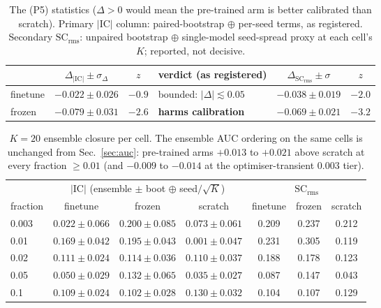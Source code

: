 \documentclass[11pt]{article}
\newcommand{\IC}{\ensuremath{\mathrm{IC}}}
\newcommand{\SCr}{\ensuremath{\mathrm{SC_{rms}}}}
\begin{document}
\begin{table}[h]\centering\small
\begin{tabular}{@{}lccl|cc@{}}
\toprule
 & $\Delta_{|\IC|} \pm \sigma_\Delta$ & $z$ & verdict (as registered)
 & $\Delta_{\SCr} \pm \sigma$ & $z$ \\
\midrule
finetune & $-0.022 \pm 0.026$ & $-0.9$ & bounded: $|\Delta| \lesssim 0.05$
         & $-0.038 \pm 0.019$ & $-2.0$ \\
frozen   & $-0.079 \pm 0.031$ & $-2.6$ & \textbf{harms calibration}
         & $-0.069 \pm 0.021$ & $-3.2$ \\
\bottomrule
\end{tabular}
\caption{The (P5) statistics ($\Delta > 0$ would mean the pre-trained arm is better
calibrated than scratch). Primary $|\IC|$ column: paired-bootstrap $\oplus$ per-seed
terms, as registered. Secondary \SCr: unpaired bootstrap $\oplus$ single-model seed-spread
proxy at each cell's $K$; reported, not decisive.}
\label{tab:p5verdict}
\end{table}

\begin{table}[h]\centering\small
\begin{tabular}{@{}lccc|ccc@{}}
\toprule
 & \multicolumn{3}{c|}{$|\IC|$ (ensemble $\pm$ boot $\oplus$ seed$/\sqrt{K}$)}
 & \multicolumn{3}{c}{\SCr} \\
fraction & finetune & frozen & scratch & finetune & frozen & scratch \\
\midrule
0.003 & $0.022 \pm 0.066$ & $0.200 \pm 0.085$ & $0.073 \pm 0.061$ & 0.209 & 0.237 & 0.212 \\
0.01  & $0.169 \pm 0.042$ & $0.195 \pm 0.043$ & $0.001 \pm 0.047$ & 0.231 & 0.305 & 0.119 \\
0.02  & $0.111 \pm 0.024$ & $0.114 \pm 0.036$ & $0.110 \pm 0.037$ & 0.188 & 0.178 & 0.123 \\
0.05  & $0.050 \pm 0.029$ & $0.132 \pm 0.065$ & $0.035 \pm 0.027$ & 0.087 & 0.147 & 0.043 \\
0.1   & $0.109 \pm 0.024$ & $0.102 \pm 0.028$ & $0.130 \pm 0.032$ & 0.104 & 0.107 & 0.129 \\
\bottomrule
\end{tabular}
\caption{$K{=}20$ ensemble closure per cell. The ensemble AUC ordering on the same cells
is unchanged from Sec.~\ref{sec:auc}: pre-trained arms $+0.013$ to $+0.021$ above scratch
at every fraction $\ge 0.01$ (and $-0.009$ to $-0.014$ at the optimiser-transient
$0.003$ tier).}
\label{tab:p5cells}
\end{table}
\end{document}
